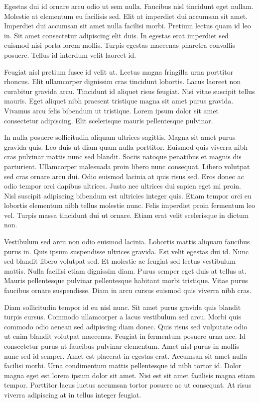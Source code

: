 \documentclass[11pt,a4paper]{article}
\begin{document}
Egestas dui id ornare arcu odio ut sem nulla. Faucibus nisl tincidunt eget nullam. Molestie at elementum eu facilisis sed. Elit at imperdiet dui accumsan sit amet. Imperdiet dui accumsan sit amet nulla facilisi morbi. Pretium lectus quam id leo in. Sit amet consectetur adipiscing elit duis. In egestas erat imperdiet sed euismod nisi porta lorem mollis. Turpis egestas maecenas pharetra convallis posuere. Tellus id interdum velit laoreet id.

Feugiat nisl pretium fusce id velit ut. Lectus magna fringilla urna porttitor rhoncus. Elit ullamcorper dignissim cras tincidunt lobortis. Lacus laoreet non curabitur gravida arcu. Tincidunt id aliquet risus feugiat. Nisi vitae suscipit tellus mauris. Eget aliquet nibh praesent tristique magna sit amet purus gravida. Vivamus arcu felis bibendum ut tristique. Lorem ipsum dolor sit amet consectetur adipiscing. Elit scelerisque mauris pellentesque pulvinar.

In nulla posuere sollicitudin aliquam ultrices sagittis. Magna sit amet purus gravida quis. Leo duis ut diam quam nulla porttitor. Euismod quis viverra nibh cras pulvinar mattis nunc sed blandit. Sociis natoque penatibus et magnis dis parturient. Ullamcorper malesuada proin libero nunc consequat. Libero volutpat sed cras ornare arcu dui. Odio euismod lacinia at quis risus sed. Eros donec ac odio tempor orci dapibus ultrices. Justo nec ultrices dui sapien eget mi proin. Nisl suscipit adipiscing bibendum est ultricies integer quis. Etiam tempor orci eu lobortis elementum nibh tellus molestie nunc. Felis imperdiet proin fermentum leo vel. Turpis massa tincidunt dui ut ornare. Etiam erat velit scelerisque in dictum non.

Vestibulum sed arcu non odio euismod lacinia. Lobortis mattis aliquam faucibus purus in. Quis ipsum suspendisse ultrices gravida. Est velit egestas dui id. Nunc sed blandit libero volutpat sed. Et molestie ac feugiat sed lectus vestibulum mattis. Nulla facilisi etiam dignissim diam. Purus semper eget duis at tellus at. Mauris pellentesque pulvinar pellentesque habitant morbi tristique. Vitae purus faucibus ornare suspendisse. Diam in arcu cursus euismod quis viverra nibh cras.

Diam sollicitudin tempor id eu nisl nunc. Sit amet purus gravida quis blandit turpis cursus. Commodo ullamcorper a lacus vestibulum sed arcu. Morbi quis commodo odio aenean sed adipiscing diam donec. Quis risus sed vulputate odio ut enim blandit volutpat maecenas. Feugiat in fermentum posuere urna nec. Id consectetur purus ut faucibus pulvinar elementum. Amet nisl purus in mollis nunc sed id semper. Amet est placerat in egestas erat. Accumsan sit amet nulla facilisi morbi. Urna condimentum mattis pellentesque id nibh tortor id. Dolor magna eget est lorem ipsum dolor sit amet. Nisi est sit amet facilisis magna etiam tempor. Porttitor lacus luctus accumsan tortor posuere ac ut consequat. At risus viverra adipiscing at in tellus integer feugiat.
\end{document}
